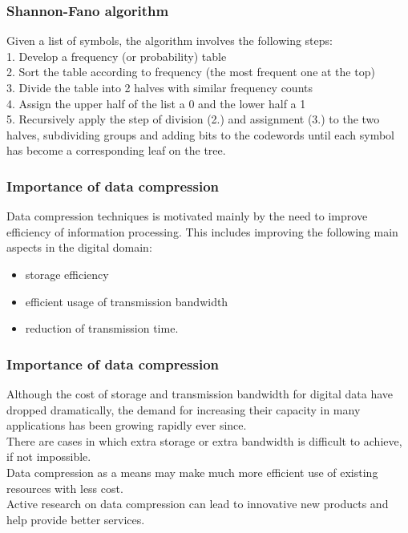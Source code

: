 \documentclass[a4]{beamer}
\begin{document}
\begin{frame}
\frametitle{Shannon-Fano algorithm}
Given a list of symbols, the algorithm involves the following steps:\\
1. Develop a frequency (or probability) table\\
2. Sort the table according to frequency (the most frequent one at the top)\\
3. Divide the table into 2 halves with similar frequency counts\\
4. Assign the upper half of the list a 0 and the lower half a 1\\
5. Recursively apply the step of division (2.) and assignment (3.) to the
two halves, subdividing groups and adding bits to the codewords until
each symbol has become a corresponding leaf on the tree.
\end{frame}
\begin{frame}
\frametitle{Importance of data compression}
Data compression techniques is motivated mainly by the need to improve
efficiency of information processing. This includes improving the following
main aspects in the digital domain:
\begin{itemize} \item storage efficiency
\item  efficient usage of transmission bandwidth
\item reduction of transmission time. \end{itemize}
\end{frame}
\begin{frame}
\frametitle{Importance of data compression}
Although the cost of storage and transmission bandwidth for digital data
have dropped dramatically, the demand for increasing their capacity in many
applications has been growing rapidly ever since.\\ There are cases in which
extra storage or extra bandwidth is difficult to achieve, if not impossible.\\
Data compression as a means may make much more efficient use of existing
resources with less cost. \\ Active research on data compression can lead to
innovative new products and help provide better services.
\end{frame}
\end{document}
